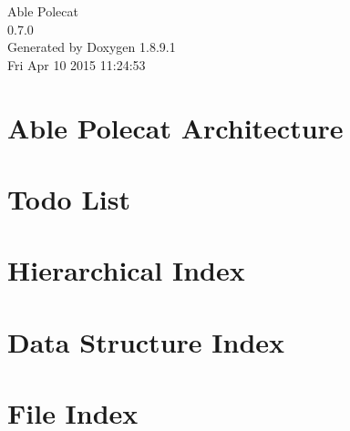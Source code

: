 \documentclass[twoside]{book}
\newcommand{\+}{\discretionary{\mbox{\scriptsize$\hookleftarrow$}}{}{}}
\newcommand{\clearemptydoublepage}{%
  \newpage{\pagestyle{empty}\cleardoublepage}%
}
\begin{document}
\hypersetup{pageanchor=false,
             bookmarks=true,
             bookmarksnumbered=true,
             pdfencoding=unicode
            }
\begin{titlepage}
\vspace*{7cm}
\begin{center}%
{\Large Able Polecat \\[1ex]\large 0.\+7.\+0 }\\
\vspace*{1cm}
{\large Generated by Doxygen 1.8.9.1}\\
\vspace*{0.5cm}
{\small Fri Apr 10 2015 11:24:53}\\
\end{center}
\end{titlepage}
\clearemptydoublepage
\tableofcontents
\clearemptydoublepage
{}
\hypersetup{pageanchor=true}

\chapter{Able Polecat Architecture}
\label{index}\hypertarget{index}{}
\chapter{Todo List}
\label{todo}
\hypertarget{todo}{}

\chapter{Hierarchical Index}

\chapter{Data Structure Index}

\chapter{File Index}

\end{document}

